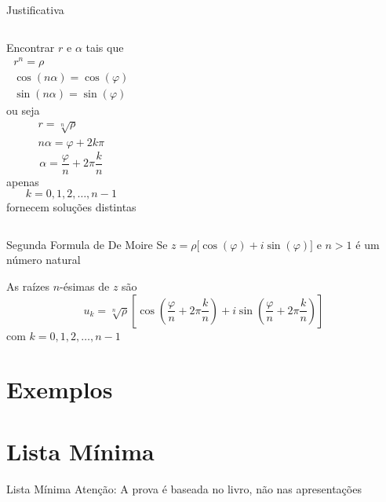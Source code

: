 \documentclass[fleqn,utf8,aspectratio=169,12pt]{beamer}
\begin{document}
\begin{proofframe}{Justificativa}
\begin{columns}
  Encontrar $r$ e $\alpha$
  \pause
   tais que
  \begin{gather*}
    r^n = \rho \\
    \cos(n\alpha) = \cos(\varphi) \\
    \sin(n\alpha) = \sin(\varphi)
  \end{gather*}
  \pause
  ou seja
  \begin{gather*}
    r = \sqrt[n]{\rho} \\
    n\alpha = \varphi + 2k\pi
  \end{gather*}
  \pause
  \[
    \alpha = \frac{\varphi}{n} + 2\pi\frac{k}{n}
  \]
  \pause
  apenas
  \[
    k = 0, 1, 2, \dots, n-1
  \]
  fornecem soluções distintas
\end{columns}
\end{proofframe}

\begin{frame}{Segunda Formula de De Moire}
  Se
  \(
    z = \rho \big[\cos(\varphi) + i\sin(\varphi)\big]
  \)
  e $n>1$ é um número natural

  \vspace{\baselineskip}
  As raízes $n$-ésimas de $z$ são
  \[
    u_k = \sqrt[n]{\rho}
    \left[
         \cos\left(\frac{\varphi}{n}+2\pi\frac{k}{n}\right)
      + i\sin\left(\frac{\varphi}{n}+2\pi\frac{k}{n}\right)
    \right]
  \]
  com \(k=0, 1, 2, \dots, n-1\)
\end{frame}

\section{Exemplos}







\section{Lista Mínima}

\begin{frame}{Lista Mínima}
  Atenção: A prova é baseada no livro, não nas apresentações
\end{frame}

\end{document}
